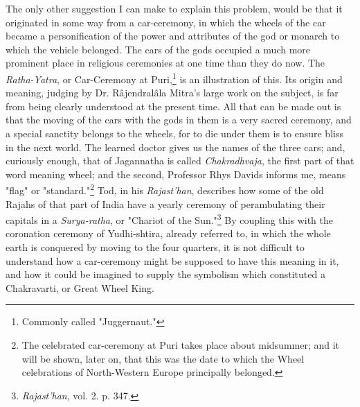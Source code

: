 \documentclass[a4paper, 11pt, oneside, polutonikogreek, english]{article}
\begin{document}
The only other suggestion I can make to explain this problem, would be that it originated in some way from a car-ceremony, in which the wheels of the car became a personification of the power and attributes of the god or monarch to which the vehicle belonged. The cars of the gods occupied a much more prominent place in religious ceremonies at one time than they do now. The \emph{Ratha-Yatra}, or Car-Ceremony at Puri,\footnote{Commonly called "Juggernaut."} is an illustration of this. Its origin and meaning, judging by Dr. Râjendralâla Mitra's large work on the subject, is far from being clearly understood at the present time. All that can be made out is that the moving of the cars with the gods in them is a very sacred ceremony, and a special sanctity belongs to the wheels, for to die under them is to ensure bliss in the next world. The learned doctor gives us the names of the three cars; and, curiously enough, that of Jagannatha is called \emph{Chakradhvaja}, the first part of that word meaning wheel; and the second, Professor Rhys Davids informs me, means "flag" or "standard."\footnote{The celebrated car-ceremony at Puri takes place about midsummer; and it will be shown, later on, that this was the date to which the Wheel celebrations of North-Western Europe principally belonged.} Tod, in his \emph{Rajast'han}, describes how some of the old Rajahs of that part of India have a yearly ceremony of perambulating their capitals in a \emph{Surya-ratha}, or "Chariot of the Sun."\footnote{\emph{Rajast'han}, vol. 2. p. 347.} By coupling this with the coronation ceremony of Yudhi-shtira, already referred to, in which the whole earth is conquered by moving to the four quarters, it is not difficult to understand how a car-ceremony might be supposed to have this meaning in it, and how it could be imagined to supply the symbolism which constituted a Chakravarti, or Great Wheel King.
\end{document}
